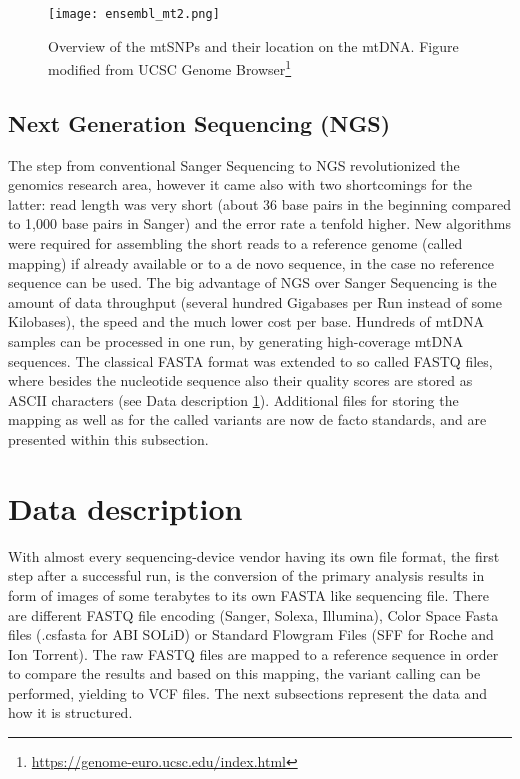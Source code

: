 \begin{figure}[ht]
\begin{center}
\texttt{[image: ensembl\_mt2.png]}
\caption[mtSNPs location on mtDNA]{Overview of the mtSNPs and their location on the mtDNA. Figure modified from UCSC Genome Browser\footnote{\url{https://genome-euro.ucsc.edu/index.html}}}
\label{fig:figureSNPlocation}
\end{center}
\end{figure}

\subsection{Next Generation Sequencing (NGS)}
The step from conventional Sanger Sequencing to NGS revolutionized the genomics research area, however it came also with two shortcomings for the latter: read length was very short (about 36 base pairs\cite{Li2013a} in the beginning compared to 1,000 base pairs in Sanger) and the error rate a tenfold higher. New algorithms were required for assembling the short reads to a reference genome (called mapping) if already available or to a de novo sequence, in the case no reference sequence can be used. The big advantage of NGS over Sanger Sequencing is the amount of data throughput (several hundred Gigabases per Run instead of some Kilobases), the speed and the much lower cost per base. Hundreds of mtDNA samples can be processed in one run, by generating high-coverage mtDNA sequences. 
The classical FASTA format was extended to so called FASTQ files, where besides the nucleotide sequence also their quality scores are stored as ASCII characters (see Data description \ref{datadescription}). Additional files for storing the mapping as well as for the called variants are now de facto standards, and are presented within this subsection. 
\section{Data description}\label{datadescription}
With almost every sequencing-device vendor having its own file format, the first step after a successful run, is the conversion of the primary analysis results in form of images of some terabytes to its own FASTA like sequencing file. There are different FASTQ file encoding (Sanger, Solexa, Illumina), Color Space Fasta files (.csfasta for ABI SOLiD) or Standard Flowgram Files (SFF for Roche and Ion Torrent). The raw FASTQ files are mapped to a reference sequence in order to compare the results and based on this mapping, the variant calling can be performed, yielding to VCF files. The next subsections represent the data and how it is structured. 
